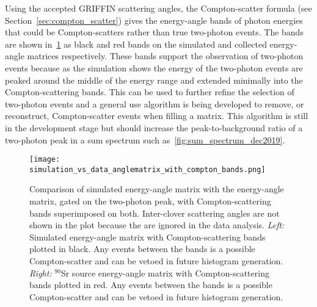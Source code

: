 \documentclass[cnatzke_thesis_proposal.tex]{subfiles}
\begin{document}
Using the accepted GRIFFIN scattering angles, the Compton-scatter formula (see Section~\ref{sec:compton_scatter}) gives the energy-angle bands of photon energies that could be Compton-scatters rather than true two-photon events.
The bands are shown in~\ref{fig:simulation_data_comparison_with_compton_bands} as black and red bands on the simulated and collected energy-angle matrices respectively.
These bands support the observation of two-photon events because as the simulation shows the energy of the two-photon events are peaked around the middle of the energy range and extended minimally into the Compton-scattering bands. 
This can be used to further refine the selection of two-photon events and a general use algorithm is being developed to remove, or reconstruct, Compton-scatter events when filling a matrix. 
This algorithm is still in the development stage but should increase the peak-to-background ratio of a two-photon peak in a sum spectrum such as~\ref{fig:sum_spectrum_dec2019}.

\begin{figure}[htbp]
  \centering
  \texttt{[image: simulation\_vs\_data\_anglematrix\_with\_compton\_bands.png]}
  \caption{Comparison of simulated energy-angle matrix with the energy-angle matrix, gated on the two-photon peak, with Compton-scattering bands superimposed on both. Inter-clover scattering angles are not shown in the plot because the are ignored in the data analysis.  
    \textit{Left:} Simulated energy-angle matrix with Compton-scattering bands plotted in black. Any events between the bands is a possible Compton-scatter and can be vetoed in future histogram generation.
    \textit{Right:} $^{90}$Sr source energy-angle matrix with Compton-scattering bands plotted in red. Any events between the bands is a possible Compton-scatter and can be vetoed in future histogram generation.
  }
  \label{fig:simulation_data_comparison_with_compton_bands}
\end{figure}
\end{document}
